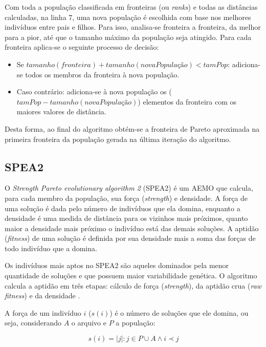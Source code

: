 Com toda a população classificada em fronteiras (ou \textit{ranks}) e todas as distâncias calculadas, na linha 7, uma nova população é escolhida com base nos melhores indivíduos entre pais e filhos. Para isso, analisa-se fronteira a fronteira, da melhor para a pior, até que o tamanho máximo da população seja atingido. Para cada fronteira aplica-se o seguinte processo de decisão:

\begin{itemize}  
	\item Se $tamanho(fronteira) + tamanho(novaPopulação) < tamPop$: adiciona-se todos os membros da fronteira à nova população.
	\item Caso contrário: adiciona-se à nova população os ($tamPop - tamanho(novaPopulação)$) elementos da fronteira com os maiores valores de distância.
\end{itemize}

Desta forma, ao final do algoritmo obtém-se a fronteira de Pareto aproximada na primeira fronteira da população gerada na última iteração do algoritmo.

\subsection{SPEA2}

O \textit{Strength Pareto evolutionary algorithm 2} (SPEA2) \cite{Zitzler2002} é um AEMO que calcula, para cada membro da população, sua força (\textit{strength}) e densidade. A força de uma solução é dada pelo número de indivíduos que ela domina, enquanto a densidade é uma medida de distância para os vizinhos mais próximos, quanto maior a densidade mais próximo o indivíduo está das demais soluções. A aptidão (\textit{fitness}) de uma solução é definida por sua densidade mais a soma das forças de todo indivíduo que a domina. 

Os indivíduos mais aptos no SPEA2 são aqueles dominados pela menor quantidade de soluções e que possuem maior variabilidade genética. O algoritmo calcula a aptidão em três etapas: cálculo de força (\textit{strength}), da aptidão crua (\textit{raw fitness}) e da densidade \cite{Zitzler2002}.

A força de um indivíduo $i$ ($s(i)$) é o número de soluções que ele domina, ou seja, considerando $A$ o arquivo e $P$ a população:

\begin{equation}s(i) = |j|: j \in P \cup A \land i \prec j\end{equation}

